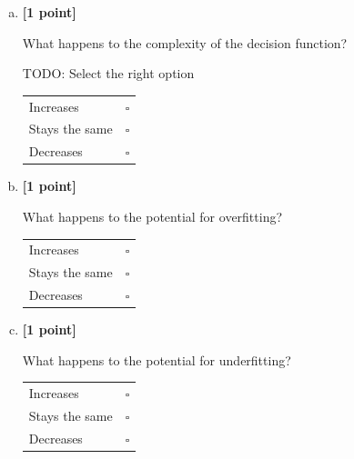\begin{enumerate}[(a)]
\pagebreak
    \item \textbf{[1 point]}
    \begin{tcolorbox}[colback=orange!5!white,colframe=orange!75!black]
    What happens to the complexity of the decision function?
    \end{tcolorbox}
    \begin{tcolorbox}[colback=white!5!white,colframe=green!75!black]
    TODO: Select the right option %

    \begin{tabular}[h]{lr}
    \toprule
    Increases & $\square$ \\
    Stays the same & $\square$ \\
    Decreases & $\square$ \\
    \bottomrule
    \end{tabular}
    \end{tcolorbox}

    \item \textbf{[1 point]}
    \begin{tcolorbox}[colback=orange!5!white,colframe=orange!75!black]
    What happens to the potential for overfitting?
    \end{tcolorbox}
    \begin{tcolorbox}[colback=white!5!white,colframe=green!75!black]

    \begin{tabular}[h]{lr}
    \toprule
    Increases & $\square$ \\
    Stays the same & $\square$ \\
    Decreases & $\square$ \\
    \bottomrule
    \end{tabular}
    \end{tcolorbox}

    \item \textbf{[1 point]}
    \begin{tcolorbox}[colback=orange!5!white,colframe=orange!75!black]
    What happens to the potential for underfitting?
    \end{tcolorbox}
    \begin{tcolorbox}[colback=white!5!white,colframe=green!75!black]
    
    \begin{tabular}[h]{lr}
    \toprule
    Increases & $\square$ \\
    Stays the same & $\square$ \\
    Decreases & $\square$ \\
    \bottomrule
    \end{tabular}
    \end{tcolorbox}


\end{enumerate}
